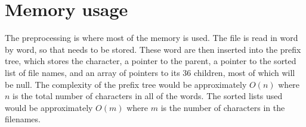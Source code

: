 \documentclass[letterpaper,12pt]{article}
\begin{document}
\section*{Memory usage}
The preprocessing is where most of the memory is used. The file is read in word
by word, so that needs to be stored.  These word are then inserted into the
prefix tree, which stores the character, a pointer to the parent, a pointer to
the sorted list of file names, and an array of pointers to its 36 children, most
of which will be null.  The complexity of the prefix tree would be approximately
$O(n)$ where $n$ is the total number of characters in all of the words.  The
sorted lists used would be approximately $O(m)$ where $m$ is the number of
characters in the filenames.
\end{document}
